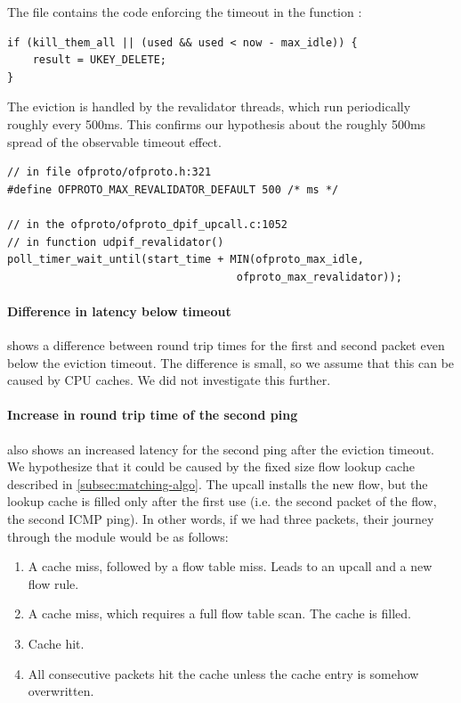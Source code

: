 The file  contains the code enforcing the timeout in the function :

\begin{verbatim}
if (kill_them_all || (used && used < now - max_idle)) {
    result = UKEY_DELETE;
}
\end{verbatim}

The eviction is handled by the revalidator threads, which run periodically roughly every 500ms. This confirms our hypothesis about the roughly 500ms spread of the observable timeout effect.

\begin{verbatim}
// in file ofproto/ofproto.h:321
#define OFPROTO_MAX_REVALIDATOR_DEFAULT 500 /* ms */

// in the ofproto/ofproto_dpif_upcall.c:1052
// in function udpif_revalidator()
poll_timer_wait_until(start_time + MIN(ofproto_max_idle,
                                    ofproto_max_revalidator));
\end{verbatim}

\paragraph{Difference in latency below timeout}
 shows a difference between round trip times for the first and second packet even below the eviction timeout. The difference is small, so we assume that this can be caused by CPU caches. We did not investigate this further.

\paragraph{Increase in round trip time of the second ping}
 also shows an increased latency for the second ping after the eviction timeout. We hypothesize that it could be caused by the fixed size flow lookup cache described in \cref{subsec:matching-algo}. The upcall installs the new flow, but the lookup cache is filled only after the first use (i.e. the second packet of the flow, the second ICMP ping). In other words, if we had three packets, their journey through the  module would be as follows:

\begin{enumerate}
    \item A cache miss, followed by a flow table miss. Leads to an upcall and a new flow rule.
    \item A cache miss, which requires a full flow table scan. The cache is filled.
    \item Cache hit.
    \item All consecutive packets hit the cache unless the cache entry is somehow overwritten.
\end{enumerate}

